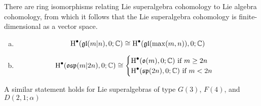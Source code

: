\begin{theorem}
There are ring isomorphisms relating Lie superalgebra cohomology to Lie algebra cohomology, from which it follows that the Lie superalgebra cohomology is finite-dimensional as a vector space.
  \begin{enumerate}[(a)]
  \item \[\operatorname{H}^\bullet(\mathfrak{gl}(m|n),0;\mathbb{C}) \cong \operatorname{H}^\bullet(\mathfrak{gl}(\max(m,n)),0;\mathbb{C})\]
  \item \[
            \operatorname{H}^\bullet(\mathfrak{osp}(m|2n),0;\mathbb{C}) \cong
      \begin{cases}
        \operatorname{H}^\bullet(\mathfrak{o}(m),0;\mathbb{C}) \text{ if } m \geq 2n \\
        \operatorname{H}^\bullet(\mathfrak{sp}(2n),0;\mathbb{C}) \text{ if } m < 2n
\end{cases}
    \]
  \end{enumerate}
   A similar statement holds for Lie superalgebras of type $G(3)$, $F(4)$, and $D(2,1;\alpha)$
\end{theorem}




